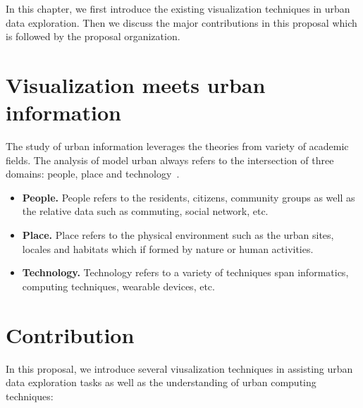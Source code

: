 In this chapter, we first introduce the existing visualization techniques in urban data exploration. Then we discuss the major contributions in this proposal which is followed by the proposal organization.

\section{Visualization meets urban information}

The study of urban information leverages the theories from variety of academic fields. The analysis of model urban always refers to the intersection of three domains: people, place and technology~\cite{foth2011urban}. 
\begin{itemize}
\item \textbf{People.} People refers to the residents, citizens, community groups as well as the relative data such as commuting, social network, etc.
\item \textbf{Place.} Place refers to the physical environment such as the urban sites, locales and habitats which if formed by nature or human activities.
\item \textbf{Technology.} Technology refers to a variety of techniques span informatics, computing techniques, wearable devices, etc.
\end{itemize}


\section{Contribution}
In this proposal, we introduce several viusalization techniques in assisting urban data exploration tasks as well as the understanding of urban computing techniques:

